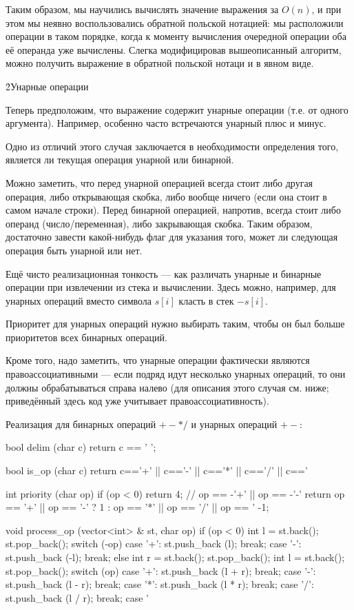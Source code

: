 Таким образом, мы научились вычислять значение выражения за $O (n)$, и при этом мы неявно воспользовались обратной польской нотацией: мы расположили операции в таком порядке, когда к моменту вычисления очередной операции оба её операнда уже вычислены. Слегка модифицировав вышеописанный алгоритм, можно получить выражение в обратной польской нотаци и в явном виде.


\h2{Унарные операции}

Теперь предположим, что выражение содержит унарные операции (т.е. от одного аргумента). Например, особенно часто встречаются унарный плюс и минус.

Одно из отличий этого случая заключается в необходимости определения того, является ли текущая операция унарной или бинарной.

Можно заметить, что перед унарной операцией всегда стоит либо другая операция, либо открывающая скобка, либо вообще ничего (если она стоит в самом начале строки). Перед бинарной операцией, напротив, всегда стоит либо операнд (число/переменная), либо закрывающая скобка. Таким образом, достаточно завести какой-нибудь флаг для указания того, может ли следующая операция быть унарной или нет.

Ещё чисто реализационная тонкость --- как различать унарные и бинарные операции при извлечении из стека и вычислении. Здесь можно, например, для унарных операций вместо символа $s[i]$ класть в стек $-s[i]$.

Приоритет для унарных операций нужно выбирать таким, чтобы он был больше приоритетов всех бинарных операций.

Кроме того, надо заметить, что унарные операции фактически являются правоассоциативными --- если подряд идут несколько унарных операций, то они должны обрабатываться справа налево (для описания этого случая см. ниже; приведённый здесь код уже учитывает правоассоциативность).

Реализация для бинарных операций $+-*/$ и унарных операций $+-$:

\code
bool delim (char c) {
	return c == ' ';
}

bool is_op (char c) {
	return c=='+' || c=='-' || c=='*' || c=='/' || c=='%
}

int priority (char op) {
	if (op < 0)
		return 4; // op == -'+' || op == -'-'
	return
		op == '+' || op == '-' ? 1 :
		op == '*' || op == '/' || op == '%
		-1;
}

void process_op (vector<int> & st, char op) {
	if (op < 0) {
		int l = st.back();  st.pop_back();
		switch (-op) {
			case '+':  st.push_back (l);  break;
			case '-':  st.push_back (-l);  break;
		}
	}
	else {
		int r = st.back();  st.pop_back();
		int l = st.back();  st.pop_back();
		switch (op) {
			case '+':  st.push_back (l + r);  break;
			case '-':  st.push_back (l - r);  break;
			case '*':  st.push_back (l * r);  break;
			case '/':  st.push_back (l / r);  break;
			case '%
		}
	}
}

